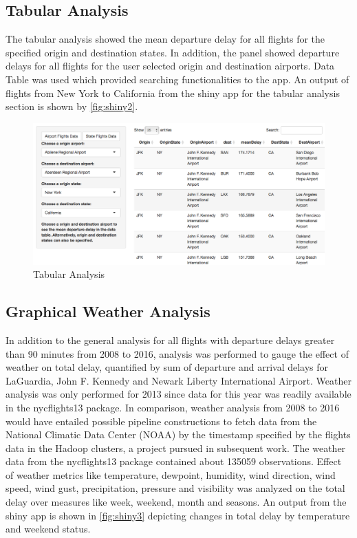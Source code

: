 \documentclass[12pt,twoside]{amherstthesis}
\begin{document}
  \subsection{Tabular Analysis}\label{tabular-analysis}
  
  The tabular analysis showed the mean departure delay for all flights for
  the specified origin and destination states. In addition, the panel
  showed departure delays for all flights for the user selected origin and
  destination airports. Data Table was used which provided searching
  functionalities to the app. An output of flights from New York to
  California from the shiny app for the tabular analysis section is shown
  by \autoref{fig:shiny2}.
  
  \begin{figure}[htbp]
  \centering
  \includegraphics[scale = 0.4,angle = 0]{figure/Shiny2.png}
  \caption[Tabular Analysis]{\normalsize{Tabular Analysis}}
  \label{fig:shiny2}
  \end{figure}
  
  \clearpage
  
  \subsection{Graphical Weather
  Analysis}\label{graphical-weather-analysis}
  
  In addition to the general analysis for all flights with departure
  delays greater than 90 minutes from 2008 to 2016, analysis was performed
  to gauge the effect of weather on total delay, quantified by sum of
  departure and arrival delays for LaGuardia, John F. Kennedy and Newark
  Liberty International Airport. Weather analysis was only performed for
  2013 since data for this year was readily available in the nycflights13
  package. In comparison, weather analysis from 2008 to 2016 would have
  entailed possible pipeline constructions to fetch data from the National
  Climatic Data Center (NOAA) by the timestamp specified by the flights
  data in the Hadoop clusters, a project pursued in subsequent work. The
  weather data from the nycflights13 package contained about 135059
  observations. Effect of weather metrics like temperature, dewpoint,
  humidity, wind direction, wind speed, wind gust, precipitation, pressure
  and visibility was analyzed on the total delay over measures like week,
  weekend, month and seasons. An output from the shiny app is shown in
  \autoref{fig:shiny3} depicting changes in total delay by temperature and
  weekend status.
  
\end{document}
